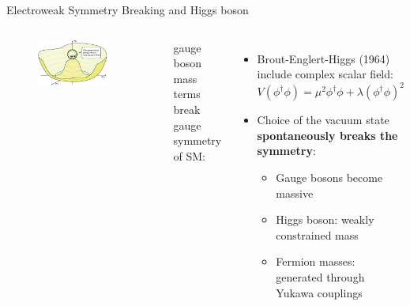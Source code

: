 \begin{frame}{Electroweak Symmetry Breaking and Higgs boson}
\begin{columns}
\begin{figure}
    \centering
    \includegraphics[width=0.8\textwidth]{Part1/Img/Higgs-Potential-lookdown.png}
\end{figure}
gauge boson mass terms break gauge symmetry of SM:
\begin{itemize}
    \item \textcolor{structurColor}{Brout-Englert-Higgs (1964)} include complex scalar field:
    \begin{equation*}
        V(\phi^\dagger\phi) = \mu^2\phi^\dagger\phi + \lambda(\phi^\dagger\phi)^2
    \end{equation*}
    \pause
    \item Choice of the vacuum state \textbf{\textcolor{applegreen}{spontaneously breaks the symmetry}}:
    \begin{itemize}
        \item Gauge bosons become massive
        \item Higgs boson: weakly constrained mass
        \item Fermion masses: generated through Yukawa couplings
    \end{itemize}
\end{itemize}


\end{columns}
\end{frame}
